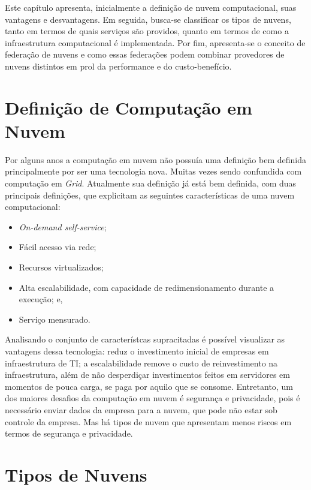 Este capítulo apresenta, inicialmente a definição de nuvem computacional, suas vantagens e desvantagens. Em seguida, busca-se classificar os tipos de nuvens, tanto em termos de quais serviços são providos, quanto em termos de como a infraestrutura computacional é implementada. Por fim, apresenta-se o conceito de federação de nuvens e como essas federações podem combinar provedores de nuvens distintos em prol da performance e do custo-benefício.

\section{Definição de Computação em Nuvem}

Por alguns anos a computação em nuvem não possuía uma definição bem definida principalmente por ser uma tecnologia nova. Muitas vezes sendo confundida com computação em \textit{Grid}. Atualmente sua definição já está bem definida, com duas principais definições\cite{NIST_CLOUD_DEFINITION}\cite{Vaquero:2008:BCT:1496091.1496100_Cloud_definition}, que explicitam as seguintes características de uma nuvem computacional: 

\begin{itemize}
	\item \textit{On-demand self-service};
	\item Fácil acesso via rede;
	\item Recursos virtualizados;
	\item Alta escalabilidade, com capacidade de redimensionamento durante a execução; e,
	\item Serviço mensurado.
\end{itemize}

Analisando o conjunto de característcas supracitadas é possível visualizar as vantagens dessa tecnologia: reduz o investimento inicial de empresas em infraestrutura de TI; a escalabilidade remove o custo de reinvestimento na infraestrutura, além de não desperdiçar investimentos feitos em servidores em momentos de pouca carga, se paga por aquilo que se consome. Entretanto, um dos maiores desafios da computação em nuvem é segurança e privacidade, pois é necessário enviar dados da empresa para a nuvem, que pode não estar sob controle da empresa. Mas há tipos de nuvem que apresentam menos riscos em termos de segurança e privacidade.

\section{Tipos de Nuvens}

